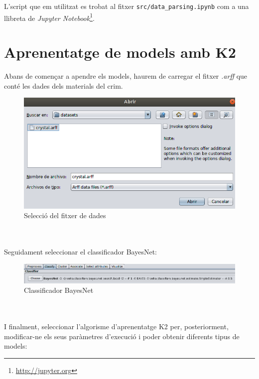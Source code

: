 \documentclass[11pt,a4paper]{article}
\begin{document}
L'script que em utilitzat es trobat al fitxer \texttt{src/data\_parsing.ipynb} com a una llibreta de \textit{Jupyter Notebook}\footnote{\url{http://jupyter.org}}.

\newpage

\part{Aprenentatge de models amb K2}
Abans de començar a apendre els models, haurem de carregar el fitxer \textit{.arff} que conté les dades dels materials del crim.\\
\begin{figure}[hbtp]
\centering
\includegraphics[scale=0.4]{Figures/1.png}
\caption{Selecció del fitxer de dades }
\end{figure}
\\\\
Seguidament seleccionar el classificador BayesNet:\\
\begin{figure}[hbtp]
\centering
\includegraphics[scale=0.5]{Figures/2.png}
\caption{Classificador BayesNet}
\end{figure}
\\\\
I finalment, seleccionar l'algorisme d'aprenentatge K2 per, posteriorment, modificar-ne els seus paràmetres d'execució i poder obtenir diferents tipus de models:\\
\end{document}

